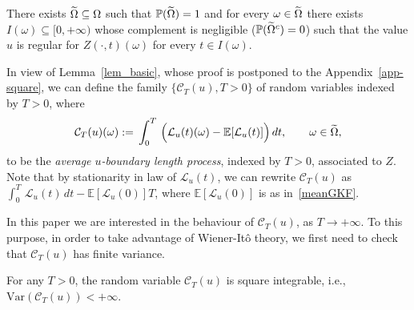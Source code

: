 \documentclass[AHL,Unicode,longabstracts,published]{cedram}
\newcommand{\clC}{\mathcal{C}}
\newcommand{\clL}{\mathcal{L}}
\newcommand{\bbP}{\mathbb{P}}
\newcommand{\bbE}{\mathbb{E}}
\newcommand{\rVar}{\mathrm{Var}}
\let\oldtilde\tilde
\renewcommand*{\tilde}[1]{\mathchoice{\widetilde{#1}}{\widetilde{#1}}{\oldtilde{#1}}{\oldtilde{#1}}}
\begin{document}
\begin{lemm}\label{lem_basic}
There exists $\tilde \Omega \subseteq \Omega$ such that $
\bbP(\tilde \Omega)=1$ and for every $\omega\in \tilde \Omega$ there exists $I(\omega)\subseteq [0,+\infty)$ whose complement is negligible ($\bbP(\tilde{\Omega}^c)=0$) such that the value $u$ is regular for $Z(\cdot, t)(\omega)$ for every $t\in I(\omega)$.
\end{lemm}

In view of Lemma~\ref{lem_basic}, whose proof is postponed to the Appendix~\ref{app-square}, we can define the family $\{ \clC_T(u), T>0\}$ of random variables indexed by $T>0$, where
\begin{equation}\label{rap_int}
\clC_{T}(u)(\omega):=\,\int_{0}^{T}\,\Big(\clL_{u}(t)(\omega)-\bbE[
\clL_{u}(t)]\Big)\,dt,\qquad \omega\in \tilde \Omega,
\end{equation}
to be the \emph{average $u$-boundary length process}, indexed by $T>0$, associated to $Z$. Note that by stationarity in law of $\clL_u(t)$, we can rewrite $\clC_{T}(u)$ as $\int_{0}^{T}\,\clL_{u}(t)\,dt -\bbE[
\clL_{u}(0)] T$, where $\bbE[
\clL_{u}(0)]$ is as in~\eqref{meanGKF}.

In this paper we are interested in the behaviour of $\clC_T(u)$, as $ T\to +\infty$. To this purpose, in order to take advantage of Wiener-It\^o theory, we first need to check that $\clC_T(u)$ has finite variance.

\begin{lemm}\label{squareL}
For any $T>0$, the random variable $\clC_T(u)$ is square integrable, i.e., $\rVar(\clC_T(u)) < +\infty$.
\end{lemm}
\end{document}
